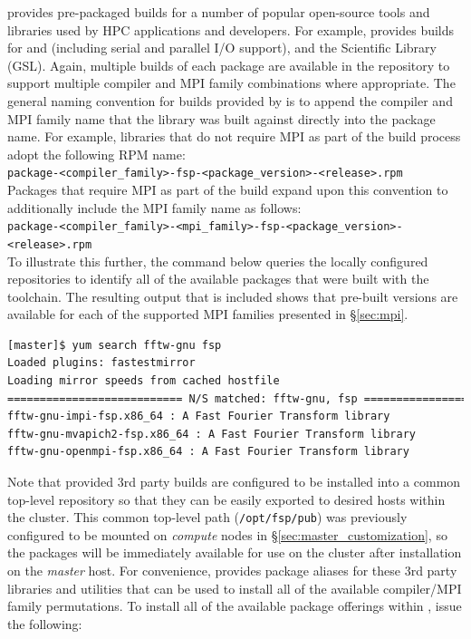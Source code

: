 \documentclass[letterpaper]{article}
\begin{document}
\FSP{} provides pre-packaged builds for a number of popular open-source
tools and libraries used by HPC applications and developers. For
example, \FSP{} provides builds for \FFTW{} and \hdffive{} (including serial and parallel
I/O support), and the \GNU{} Scientific Library (GSL). Again, multiple builds of
each package are available in the \FSP{} repository to support multiple compiler
and MPI family combinations where appropriate. The general naming convention
for builds provided by \FSP{} is to append the compiler and MPI family name that
the library was built against directly into the package name. For example,
libraries that do not require MPI as part of the build process adopt the
following RPM name: \\

\noindent
\texttt{package-<compiler\_family>-fsp-<package\_version>-<release>.rpm} \\

\noindent Packages that require MPI as part of the build expand upon this convention to
additionally include the MPI family name as follows: \\

\noindent
\texttt{package-<compiler\_family>-<mpi\_family>-fsp-<package\_version>-<release>.rpm} \\

To illustrate this further, the command below queries the locally configured
repositories to identify all of the available \FFTW{} packages that were built
with the \GNU{} toolchain. The resulting output that is included shows that
pre-built versions are available for each of the supported MPI families
presented in \S\ref{sec:mpi}.

\begin{lstlisting}[language=bash]
[master]$ yum search fftw-gnu fsp
Loaded plugins: fastestmirror
Loading mirror speeds from cached hostfile
=========================== N/S matched: fftw-gnu, fsp ===========================
fftw-gnu-impi-fsp.x86_64 : A Fast Fourier Transform library
fftw-gnu-mvapich2-fsp.x86_64 : A Fast Fourier Transform library
fftw-gnu-openmpi-fsp.x86_64 : A Fast Fourier Transform library
\end{lstlisting}

Note that \FSP{} provided 3rd party builds are configured to be installed
into a common top-level repository so that they can be easily exported to
desired hosts within the cluster. This common top-level path
(\texttt{/opt/fsp/pub}) was previously configured to be mounted on {\em
  compute} nodes in \S\ref{sec:master_customization}, so the packages will be
immediately available for use on the cluster after installation on the {\em
  master} host.  For convenience, \FSP{} provides package aliases for these 3rd
party libraries and utilities that can be used to install all of the available
compiler/MPI family permutations. To install all of the available package
offerings within \FSP{}, issue the following:
\end{document}
